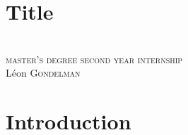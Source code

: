 \newenvironment{aquote}[1]
  {\savebox\mybox{#1}\begin{quote}}
  {\signed{\usebox\mybox}\end{quote}}




\newcommand{\bwedge}{\boldsymbol{~\wedge~}}
\newcommand{\bvee}{\boldsymbol{~\vee~}}
\newcommand{\brarr}{\boldsymbol{~\Rightarrow~}}


\newcommand{\rond}[1]{
\tikz \node[draw,circle,scale=0.22,fill=red]{\black \Huge  \textbf{#1}};}

\section*{Title}
\begin{frame}
\begin{center}
\vspace{-1.cm}

\textsc{}\\
 \textsc{ \scriptsize master's degree second year internship}\\[0.4cm]
{\small  L\'eon \textsc{Gondelman}}  \\[0.5cm]
\end{center}
\end{frame}





\begin{frame}\frametitle{}
   
\end{frame}

\section*{Introduction}
